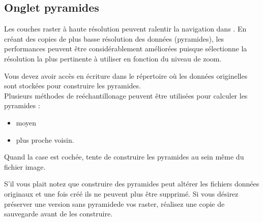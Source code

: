 \subsection{Onglet pyramides}\label{raster_pyramids}

Les couches raster à haute résolution peuvent ralentir la navigation dans \qg. En créant des copies de plus basse résolution des données (pyramides), les performances peuvent être considérablement améliorées puisque \qg sélectionne la résolution la plus pertinente à utiliser en fonction du niveau de zoom.


Vous devez avoir accès en écriture dans le répertoire où les données
originelles sont stockées pour construire les pyramides. \\
Plusieurs méthodes de reéchantillonage peuvent être utilisées pour calculer les pyramides :
\begin{itemize}[label=--]
\item moyen
\item plus proche voisin.
\end{itemize}

Quand la case  est cochée, \qg tente de construire les pyramides au sein même du fichier image.

S'il vous plait notez que construire des pyramides peut altérer les fichiers
données originaux et une fois créé ils ne peuvent plus être supprimé. Si vous désirez préserver une version \og sans pyramide\fg de vos raster, réalisez une copie de sauvegarde avant de les construire.

